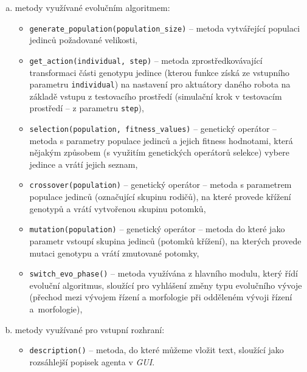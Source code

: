 \begin{enumerate}[a)]
    \item metody využívané evolučním algoritmem:
        \begin{itemize}
            \item \texttt{generate\_population(population\_size)} -- metoda
                vytvářející populaci jedinců požadované velikosti,
            \item \texttt{get\_action(individual, step)} -- metoda
                zprostředkovávající transformaci části genotypu jedince
                (kterou funkce získá ze vstupního parametru \texttt{individual}) na
                nastavení pro aktuátory daného robota na základě vstupu z
                testovacího prostředí (simulační krok v testovacím prostředí --
                z parametru \texttt{step}),
            \item \texttt{selection(population, fitness\_values)} -- genetický
                operátor -- metoda s parametry populace jedinců a jejich
                fitness hodnotami, která nějakým způsobem (s využitím
                genetických operátorů selekce) vybere jedince a vrátí jejich
                seznam,
            \item \texttt{crossover(population)} -- genetický operátor --
                metoda s parametrem populace jedinců (označující skupinu
                rodičů), na které provede křížení genotypů a vrátí vytvořenou
                skupinu potomků,
            \item \texttt{mutation(population)} -- genetický operátor -- metoda
                do které jako parametr vstoupí skupina jedinců (potomků
                křížení), na kterých provede mutaci genotypu a vrátí
                zmutované potomky,
            \item \texttt{switch\_evo\_phase()} -- metoda využívána z hlavního
                modulu, který řídí evoluční algoritmus, sloužící pro vyhlášení
                změny typu evolučního vývoje (přechod mezi vývojem řízení a
                morfologie při odděleném vývoji řízení a~morfologie),
        \end{itemize}
    \item metody využívané pro vstupní rozhraní:
        \begin{itemize}
            \item \texttt{description()} -- metoda, do které můžeme vložit
                text, sloužící jako rozsáhlejší popisek agenta v \emph{GUI}.
        \end{itemize}
\end{enumerate}

